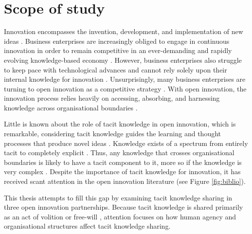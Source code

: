  \section{Scope of study}

Innovation encompasses the invention, development, and implementation of new ideas \citep{garud2013perspectives,bessant2013innovation}. Business enterprises are increasingly obliged to engage in continuous innovation in order to remain competitive in an ever-demanding and rapidly evolving knowledge-based economy \citep{lubit2001keys,urbancova2013competitive,lee2019does,jackson2020fostering}. However, business enterprises also struggle to keep pace with technological advances and cannot rely solely upon their internal knowledge for innovation \citep{nunes2020managing}. Unsurprisingly, many business enterprises are turning to open innovation as a competitive strategy \citep{stanko2017under,lee2019does}. With open innovation, the innovation process relies heavily on accessing, absorbing, and harnessing knowledge across organisational boundaries \citep{chesbrough2017future}. \medskip

Little is known about the role of tacit knowledge in open innovation, which is remarkable, considering tacit knowledge guides the learning and thought processes that produce novel ideas \citep{leonard1998role}. Knowledge exists of a spectrum from entirely tacit to completely explicit \citep{leonard1998role}. Thus, any knowledge that crosses organisational boundaries is likely to have a tacit component to it, more so if the knowledge is very complex \citep{seidler2008use,szulanski2016overcoming}. Despite the importance of tacit knowledge for innovation, it has received scant attention in the open innovation literature (see Figure \ref{fig:biblio}). \medskip

This thesis attempts to fill this gap by examining tacit knowledge sharing in three open innovation partnerships. Because tacit knowledge is shared primarily as an act of volition or free-will \citep{polanyi1966tacit}, attention focuses on how human agency and organisational structures affect tacit knowledge sharing. \medskip


